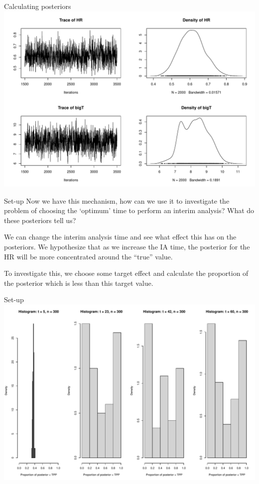 \documentclass[
  ignorenonframetext,
]{beamer}
\begin{document}
\begin{frame}{Calculating posteriors}
\includegraphics{DTEInterim_files/figure-beamer/posteriors-1.pdf}
\end{frame}

\begin{frame}{Set-up}
\protect\hypertarget{set-up-1}{}
Now we have this mechanism, how can we use it to investigate the problem
of choosing the `optimum' time to perform an interim analysis? What do
these posteriors tell us?

We can change the interim analysis time and see what effect this has on
the posteriors. We hypothesize that as we increase the IA time, the
posterior for the HR will be more concentrated around the ``true''
value.

To investigate this, we choose some target effect and calculate the
proportion of the posterior which is less than this target value.
\end{frame}

\begin{frame}{Set-up}
\protect\hypertarget{set-up-2}{}
\includegraphics{DTEInterim_files/figure-beamer/unnamed-chunk-1-1.pdf}
\end{frame}
\end{document}
